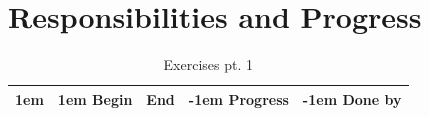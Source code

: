 \section{Responsibilities and Progress}
\begin{table}[htbp]
  \caption{Exercises pt. 1}
  \noindent\hspace*{-1cm}\begin{tabularx}{\textwidth+2cm}{
>{\raggedleft\arraybackslash\advance\hsize1em}X
>{\raggedright\arraybackslash\advance\hsize1em }X
>{\raggedright\arraybackslash}X
>{\raggedright\arraybackslash\advance\hsize-1em }X
>{\raggedright\arraybackslash\advance\hsize-1em }X
}
    \addlinespace
    \toprule
    \multicolumn{1}{c}{Exercise } & Begin & End  & Progress & Done by   \\
    \midrule
         

\end{tabularx}
\end{table}
